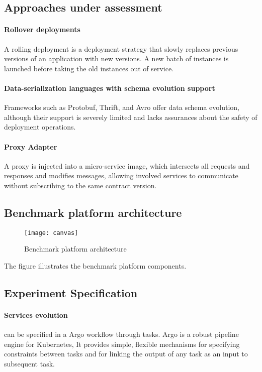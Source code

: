 \subsection{Approaches under assessment} %
\label{sec:approaches_under_assessment}

\paragraph{Rollover deployments}
A rolling deployment is a deployment strategy that slowly replaces previous versions of an application with new versions.
A new batch of instances is launched before taking the old instances out of service.

\paragraph{Data-serialization languages with schema evolution support }
Frameworks such as Protobuf, Thrift, and Avro offer data schema evolution, although their support is severely limited and lacks assurances about the safety of deployment operations.

\paragraph{Proxy Adapter}
A proxy is injected into a micro-service image, which intersects all requests and responses and modifies messages, allowing involved services to communicate without subscribing to the same contract version.

\subsection{Benchmark platform architecture} %
\label{sec:solution_architecture}

\begin{figure}[htbp]
    \centering
    \texttt{[image: canvas]}
    \caption{Benchmark platform architecture}
    \label{fig:canvas}
\end{figure}

The figure illustrates the benchmark platform components.

\subsection{Experiment Specification} %
\label{sec:experiment_specification}

\paragraph{Services evolution} can be specified in a Argo workflow through tasks.
Argo is a robust pipeline engine for Kubernetes, It provides simple, flexible mechanisms for specifying constraints between tasks and for linking the output of any task as an input to subsequent task.

